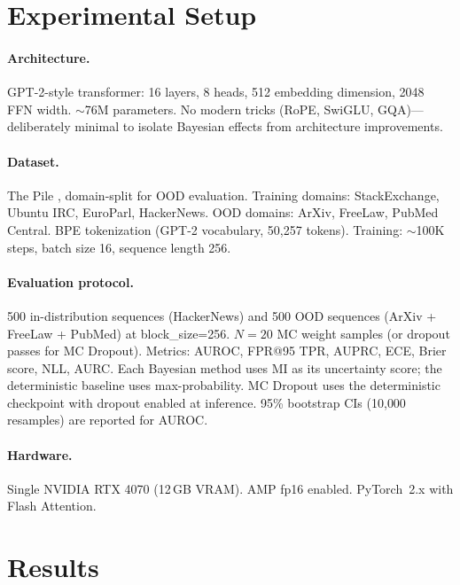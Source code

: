 \documentclass{article}
\begin{document}
\section{Experimental Setup}
\label{sec:setup}

\paragraph{Architecture.}
GPT-2-style transformer: 16 layers, 8 heads, 512 embedding dimension, 2048 FFN width. ${\sim}$76M parameters. No modern tricks (RoPE, SwiGLU, GQA)---deliberately minimal to isolate Bayesian effects from architecture improvements.

\paragraph{Dataset.}
The Pile \citep{gao2020pile}, domain-split for OOD evaluation. Training domains: StackExchange, Ubuntu IRC, EuroParl, HackerNews. OOD domains: ArXiv, FreeLaw, PubMed Central. BPE tokenization (GPT-2 vocabulary, 50{,}257 tokens). Training: ${\sim}$100K steps, batch size 16, sequence length 256.

\paragraph{Evaluation protocol.}
500 in-distribution sequences (HackerNews) and 500 OOD sequences (ArXiv + FreeLaw + PubMed) at block\_size=256. $N{=}20$ MC weight samples (or dropout passes for MC Dropout). Metrics: AUROC, FPR@95 TPR, AUPRC, ECE, Brier score, NLL, AURC. Each Bayesian method uses MI as its uncertainty score; the deterministic baseline uses max-probability. MC Dropout uses the deterministic checkpoint with dropout enabled at inference. 95\% bootstrap CIs (10{,}000 resamples) are reported for AUROC.

\paragraph{Hardware.}
Single NVIDIA RTX 4070 (12\,GB VRAM). AMP fp16 enabled. PyTorch~2.x with Flash Attention.

\section{Results}
\label{sec:results}
\end{document}

